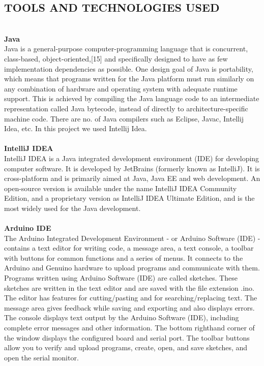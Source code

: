 \documentclass[12pt,a4paper]
{article}
\numberwithin{table}{section}
\begin{document}
{{{{{{{{\subsection{TOOLS AND TECHNOLOGIES USED}
\\
\textbf{Java}\\
\hspace{10pt}Java is a general-purpose computer-programming language that is concurrent, class-based, object-oriented,[15] and specifically designed to have as few implementation dependencies as possible. One design goal of Java is portability, which means that programs written for the Java platform must run similarly on any combination of hardware and operating system with adequate runtime support. This is achieved by compiling the Java language code to an intermediate representation called Java bytecode, instead of directly to architecture-specific machine code. There are no. of Java compilers such as Eclipse, Javac, Intellij Idea, etc. In this project we used Intellij Idea.\\
\\
\textbf{IntelliJ IDEA}\\
\hspace{10 pt}IntelliJ IDEA is a Java integrated development environment (IDE) for developing computer software. It is developed by JetBrains (formerly known as IntelliJ). It is cross-platform and is primarily aimed at Java, Java EE and web development. An open-source version is available under the name IntelliJ IDEA Community Edition, and a proprietary version as IntelliJ IDEA Ultimate Edition, and is the most widely used for the Java development.\\
\\
\textbf{Arduino IDE}\\
The Arduino Integrated Development Environment - or Arduino Software (IDE) - contains a text editor for writing code, a message area, a text console, a toolbar with buttons for common functions and a series of menus. It connects to the Arduino and Genuino hardware to upload programs and communicate with them.\\
\hspace{10 pt}Programs written using Arduino Software (IDE) are called sketches. These sketches are written in the text editor and are saved with the file extension .ino. The editor has features for cutting/pasting and for searching/replacing text. The message area gives feedback while saving and exporting and also displays errors. The console displays text output by the Arduino Software (IDE), including complete error messages and other information. The bottom righthand corner of the window displays the configured board and serial port. The toolbar buttons allow you to verify and upload programs, create, open, and save sketches, and open the serial monitor.\\
\\
}}}}}}}}
\end{document}
